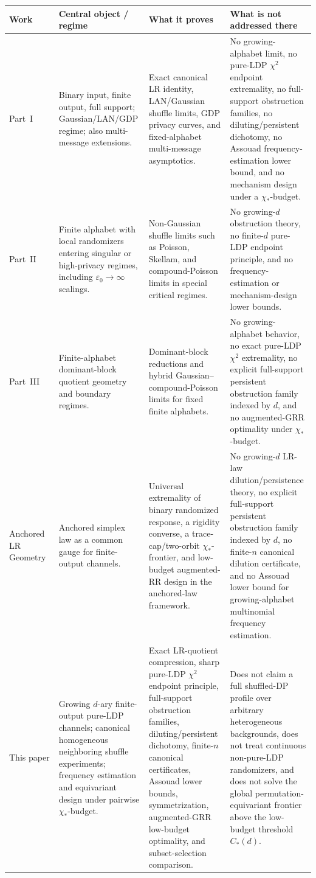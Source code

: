 \documentclass[11pt]{amsart}
\numberwithin{equation}{section}
\theoremstyle{definition}
\begin{document}
\begin{center}
\footnotesize
\renewcommand{\arraystretch}{1.18}
\begin{tabular}{p{}p{}p{}p{}}
\hline
Work & Central object / regime & What it proves & What is not addressed there \\
\hline
Part~I~\cite{ShvetsPartI}
&
Binary input, finite output, full support; Gaussian/LAN/GDP regime; also multi-message extensions.
&
Exact canonical LR identity, LAN/Gaussian shuffle limits, GDP privacy curves, and fixed-alphabet
multi-message asymptotics.
&
No growing-alphabet limit, no pure-LDP $\chi^2$ endpoint extremality, no full-support obstruction
families, no diluting/persistent dichotomy, no Assouad frequency-estimation lower bound, and no
mechanism design under a $\chi_\ast$-budget.
\\
\hline
Part~II~\cite{ShvetsPartII}
&
Finite alphabet with local randomizers entering singular or high-privacy regimes, including
$\varepsilon_0\to\infty$ scalings.
&
Non-Gaussian shuffle limits such as Poisson, Skellam, and compound-Poisson limits in special
critical regimes.
&
No growing-$d$ obstruction theory, no finite-$d$ pure-LDP endpoint principle, and no
frequency-estimation or mechanism-design lower bounds.
\\
\hline
Part~III~\cite{ShvetsPartIII}
&
Finite-alphabet dominant-block quotient geometry and boundary regimes.
&
Dominant-block reductions and hybrid Gaussian--compound-Poisson limits for fixed finite alphabets.
&
No growing-alphabet behavior, no exact pure-LDP $\chi^2$ extremality, no explicit full-support
persistent obstruction family indexed by $d$, and no augmented-GRR optimality under
$\chi_\ast$-budget.
\\
\hline
Anchored LR Geometry~\cite{ShvetsAnchoredLR}
&
Anchored simplex law as a common gauge for finite-output channels.
&
Universal extremality of binary randomized response, a rigidity converse, a trace-cap/two-orbit
$\chi_\ast$-frontier, and low-budget augmented-RR design in the anchored-law framework.
&
No growing-$d$ LR-law dilution/persistence theory, no explicit full-support persistent obstruction
family indexed by $d$, no finite-$n$ canonical dilution certificate, and no Assouad lower bound for
growing-alphabet multinomial frequency estimation.
\\
\hline
This paper
&
Growing $d$-ary finite-output pure-LDP channels; canonical homogeneous neighboring shuffle
experiments; frequency estimation and equivariant design under pairwise $\chi_\ast$-budget.
&
Exact LR-quotient compression, sharp pure-LDP $\chi^2$ endpoint principle, full-support obstruction
families, diluting/persistent dichotomy, finite-$n$ canonical certificates, Assouad lower bounds,
symmetrization, augmented-GRR low-budget optimality, and subset-selection comparison.
&
Does not claim a full shuffled-DP profile over arbitrary heterogeneous backgrounds, does not treat
continuous non-pure-LDP randomizers, and does not solve the global permutation-equivariant frontier
above the low-budget threshold $C_\ast(d)$.
\\
\hline
\end{tabular}
\end{center}
\end{document}
